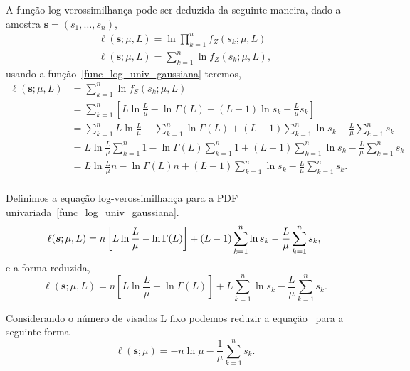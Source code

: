 A função log-verossimilhança pode ser deduzida da seguinte maneira, dado a amostra $\bm s = (s_1,\dots,s_n)$, 
\begin{equation}\nonumber
\begin{split}
  \ell(\bm s;\mu, L)=\ln\prod_{k=1}^{n}f_Z(s_k;\mu,L)\\
  \ell(\bm s;\mu, L)=\sum_{k=1}^{n}\ln f_Z(s_k;\mu,L),
 \end{split}
 \end{equation}
usando a função~\eqref{func_log_univ_gaussiana} teremos,
\begin{equation}\nonumber
\begin{split}
    \ell(\bm s;\mu, L)&=\sum_{k=1}^{n}\ln f_S(s_k;\mu,L)\\
                      &=\sum_{k=1}^{n}\left[L\ln\frac{L}{\mu}-\ln\Gamma(L)+(L-1)\ln s_k - \frac{L}{\mu} s_k\right]\\
                      &=\sum_{k=1}^{n}L\ln\frac{L}{\mu}-\sum_{k=1}^{n}\ln\Gamma(L)+(L-1)\sum_{k=1}^{n}\ln s_k - \frac{L}{\mu}\sum_{k=1}^{n} s_k\\
                      &=L\ln\frac{L}{\mu}\sum_{k=1}^{n}1-\ln\Gamma(L)\sum_{k=1}^{n}1+(L-1)\sum_{k=1}^{n}\ln s_k - \frac{L}{\mu}\sum_{k=1}^{n} s_k\\
                      &=L\ln\frac{L}{\mu}n-\ln\Gamma(L)n+(L-1)\sum_{k=1}^{n}\ln s_k - \frac{L}{\mu}\sum_{k=1}^{n} s_k.\\                
 \end{split}
 \end{equation}

Definimos a equação log-verossimilhança para a PDF univariada~\eqref{func_log_univ_gaussiana}.
\begin{equation}\nonumber
    \ell(\bm s;\mu, L)=n\left[L\ln\frac{L}{\mu}-\ln\Gamma(L)\right]+(L-1)\sum_{k=1}^{n}\ln s_k - \frac{L}{\mu}\sum_{k=1}^{n} s_k,\\                
 \end{equation}
e a forma reduzida, 
\begin{equation}
\ell(\bm s;\mu, L) = 
n \left[L\ln \frac{L}{\mu} - \ln \Gamma(L)\right]
+L \sum_{k=1}^{n}\ln s_k -\frac{L}{\mu}\sum_{k=1}^{n} s_k.
\label{eq:LogLikelihoodGamma_red}
\end{equation}

Considerando o número de visadas L fixo podemos reduzir a equação~ para a seguinte forma
\begin{equation}
\ell(\bm s;\mu) = 
-n\ln \mu -\frac{1}{\mu}\sum_{k=1}^{n} s_k.
\label{eq:LogLikelihoodGamma_red_L_fixo}
\end{equation}


